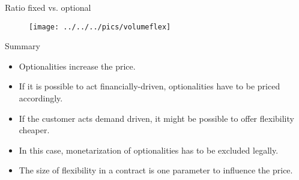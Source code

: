 {Ratio fixed vs. optional}
\begin{figure}
	\centering
		\texttt{[image: ../../../pics/volumeflex]}
	\label{fig:volumeflex}
\end{figure}

{Summary}
\begin{itemize}
\item<1-> Optionalities increase the price.
\item<2-> If it is possible to act financially-driven, optionalities have to be priced accordingly.
\item<3-> If the customer acts demand driven, it might be possible to offer flexibility cheaper.
\item<4-> In this case, monetarization of optionalities has to be excluded legally.
\item<5-> The size of flexibility in a contract is one parameter to influence the price.
\end{itemize}

